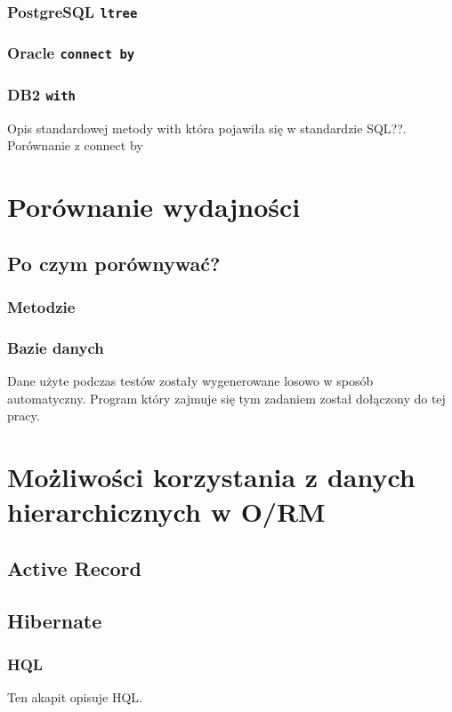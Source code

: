\documentclass[10pt,a4paper,oneside]{book}
\begin{document}
\subsection{PostgreSQL \texttt{ltree}}
\subsection{Oracle \texttt{connect by}}
\subsection{DB2 \texttt{with}}
Opis standardowej metody with która pojawiła się w standardzie SQL??. Porównanie z connect by

\chapter{Porównanie wydajności}
\section{Po czym porównywać?}
\subsection{Metodzie}
\subsection{Bazie danych}



Dane użyte podczas testów zostały wygenerowane losowo w sposób automatyczny. Program który zajmuje się tym zadaniem został dołączony do tej pracy.

\chapter{Możliwości korzystania z danych hierarchicznych w O/RM}
\section{Active Record}
\section{Hibernate}
\subsection{HQL}

Ten akapit opisuje HQL.
\end{document}
